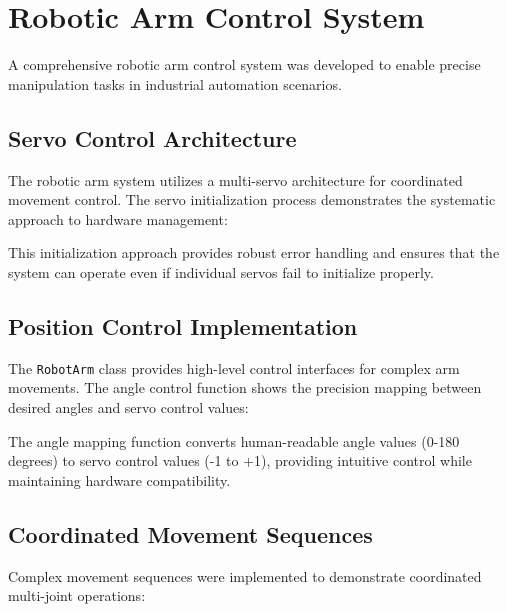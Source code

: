\documentclass{book}
\begin{document}
\section{Robotic Arm Control System}

\par\noindent A comprehensive robotic arm control system was developed to enable precise manipulation tasks in industrial automation scenarios.

\subsection{Servo Control Architecture}

\par\noindent The robotic arm system utilizes a multi-servo architecture for coordinated movement control. The servo initialization process demonstrates the systematic approach to hardware management:



\par\noindent This initialization approach provides robust error handling and ensures that the system can operate even if individual servos fail to initialize properly.

\subsection{Position Control Implementation}

\par\noindent The \texttt{RobotArm} class provides high-level control interfaces for complex arm movements. The angle control function shows the precision mapping between desired angles and servo control values:



\par\noindent The angle mapping function converts human-readable angle values (0-180 degrees) to servo control values (-1 to +1), providing intuitive control while maintaining hardware compatibility.

\subsection{Coordinated Movement Sequences}

\par\noindent Complex movement sequences were implemented to demonstrate coordinated multi-joint operations:
\end{document}
